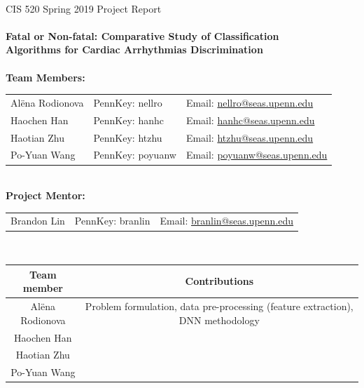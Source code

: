 \renewcommand{\headrulewidth}{0pt}
\renewcommand{\headrulewidth}{0pt}

\thispagestyle{fancy}
\mbox{}\vspace{1cm}\\
CIS 520 Spring 2019 Project Report\\
\\
{\Large \textbf{
Fatal or Non-fatal: Comparative Study of 
Classification \\Algorithms for Cardiac Arrhythmias Discrimination}} 
\\
\vspace{5cm}\\
%
%
%
\textbf{Team Members:}\\
%
\begin{tabular}{lll}%
	Al\"{e}na Rodionova & 
	PennKey: nellro &
	Email: 
	\href{mailto:nellro@seas.upenn.edu}{nellro@seas.upenn.edu} \\
	Haochen Han & 
	PennKey: hanhc& 
	Email: \href{mailto:hanhc@seas.upenn.edu}{hanhc@seas.upenn.edu}\\
	Haotian Zhu &
	PennKey: htzhu& 
	Email: \href{mailto:htzhu@seas.upenn.edu}{htzhu@seas.upenn.edu}\\
	Po-Yuan Wang & 
	PennKey: poyuanw & 
	Email:
	\href{mailto:poyuanw@seas.upenn.edu}{poyuanw@seas.upenn.edu}
\end{tabular}
%
\vspace{1cm}\\
\textbf{Project Mentor:}\\
\begin{tabular}{lll}%
	Brandon Lin & 
	PennKey: branlin &
	Email: 
	\href{mailto:branlin@seas.upenn.edu}{branlin@seas.upenn.edu} \\
\end{tabular}
\vspace{2cm}\\
\begin{table}[h!]
	\begin{center}
	\begin{tabular}{|c|c|}
		\hline
		\textbf{Team member} & \textbf{Contributions} \\ \hline
		Al\"{e}na Rodionova&   Problem formulation, data 
		pre-processing (feature extraction), DNN methodology\\ 
		\hline
		Haochen Han&     \\ \hline
		Haotian Zhu&     \\ \hline
		Po-Yuan Wang&    \\ \hline
	\end{tabular}
\end{center}
\end{table}
\newpage